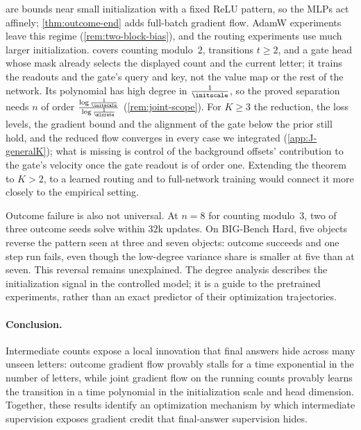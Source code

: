  are bounds near small initialization with a fixed ReLU pattern, so the MLPs act affinely;
\cref{thm:outcome-end} adds full-batch gradient flow. AdamW experiments leave this regime (\cref{rem:two-block-bias}), and the routing experiments use much
larger initialization.  covers counting modulo~$2$, transitions $t\ge2$, and a gate head whose mask already
selects the displayed count and the current letter; it trains the readouts and the gate's query and key, not the value map or
the rest of the network. Its polynomial has high degree in $\frac{1}{\initscale}$, so the proved separation needs $n$ of order
$\frac{\log\frac{1}{\initscale}}{\log\frac{1}{\mixrate}}$ (\cref{rem:joint-scope}). For $K\ge3$ the reduction, the loss levels, the gradient bound and
the alignment of the gate below the prior still hold, and the reduced flow converges in every case we integrated
(\cref{app:J-generalK}); what is missing is control of the background offsets' contribution to the gate's velocity once the
gate readout is of order one. Extending the theorem to $K>2$, to a learned routing and to full-network training would connect
it more closely to the empirical setting.

Outcome failure is also not universal. At $n=8$ for counting modulo~$3$, two of three outcome seeds solve within $32$k updates.
On BIG-Bench Hard, five objects reverse the pattern seen at three and seven objects: outcome succeeds and one step run fails,
even though the low-degree variance share is smaller at five than at seven. This reversal remains unexplained.
The degree analysis describes the initialization signal in the controlled model; it is a guide to the pretrained experiments,
rather than an exact predictor of their optimization trajectories.

\paragraph{Conclusion.} Intermediate counts expose a local innovation that final answers hide across many unseen letters:
outcome gradient flow provably stalls for a time exponential in the number of letters, while joint gradient flow on the running
counts provably learns the transition in a time polynomial in the initialization scale and head dimension. Together, these results identify an optimization
mechanism by which intermediate supervision exposes gradient credit that final-answer supervision hides.